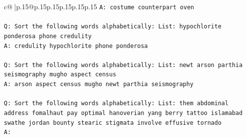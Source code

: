 \documentclass{article}
\begin{document}
{\begin{supertabular}{c@{$\;$}|p{.15\linewidth}@{}p{.15\linewidth}p{.15\linewidth}p{.15\linewidth}p{.15\linewidth}p{.15\linewidth}}
{{{\texttt{A: costume counterpart oven} \\
\\ 
\texttt{Q: Sort the following words alphabetically: List: hypochlorite ponderosa phone credulity} \\
\texttt{A: credulity hypochlorite phone ponderosa} \\
\\ 
\texttt{Q: Sort the following words alphabetically: List: newt arson parthia seismography mugho aspect census} \\
\texttt{A: arson aspect census mugho newt parthia seismography} \\
\\ 
\texttt{Q: Sort the following words alphabetically: List: them abdominal address fomalhaut pay optimal hanoverian yang berry tattoo islamabad swathe jordan bounty stearic stigmata involve effusive tornado} \\
\texttt{A:} \\
            }
        }
    }
     \\ \\


\end{supertabular}}
\end{document}

